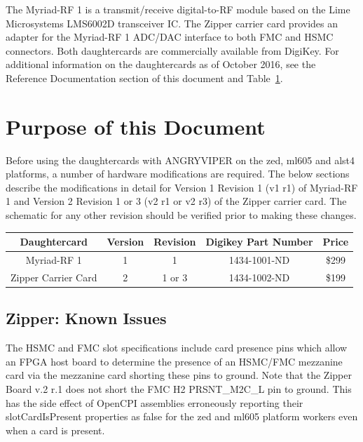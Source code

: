 \documentclass{article}
\begin{document}
\noindent The Myriad-RF 1 is a transmit/receive digital-to-RF module based on the Lime Microsystems LMS6002D transceiver IC. The Zipper carrier card provides an adapter for the Myriad-RF 1 ADC/DAC interface to both FMC and HSMC connectors. Both daughtercards are commercially available from DigiKey. For additional information on the daughtercards as of October 2016, see the Reference Documentation section of this document and Table~\ref{tab:version_info}.

\section*{Purpose of this Document}
Before using the daughtercards with ANGRYVIPER on the zed, ml605 and alst4 platforms, a number of hardware modifications are required. The below sections describe the modifications in detail for Version 1 Revision 1 (v1 r1) of Myriad-RF 1 and Version 2 Revision 1 or 3 (v2 r1 or v2 r3) of the Zipper carrier card. The schematic for any other revision should be verified prior to making these changes.
		\begin{table}[h]
			\scriptsize
			\begin{center}
  				\begin{tabular}{|c|c|c|c|c|}
    			\hline
    			\rowcolor{blue}
    			Daughtercard & Version & Revision & Digikey Part Number & Price\\
    			\hline
    			Myriad-RF 1 & 1 & 1 & 1434-1001-ND & \$299\\
    			\hline
    			Zipper Carrier Card & 2 & 1 or 3 & 1434-1002-ND & \$199\\
    			\hline
   				\end{tabular}
   				\label{tab:version_info}
		  	\end{center}
   		\end{table}
\pagebreak

\normalsize
\subsection*{Zipper: Known Issues}
The HSMC and FMC slot specifications include card presence pins which allow an FPGA host board to determine the presence of an HSMC/FMC mezzanine card via the mezzanine card shorting these pins to ground. Note that the Zipper Board v.2 r.1 does not short the FMC H2 PRSNT\_M2C\_L pin to ground. This has the side effect of OpenCPI assemblies erroneously reporting their slotCardIsPresent properties as false for the zed and ml605 platform workers even when a card is present.\par\medskip
\end{document}
